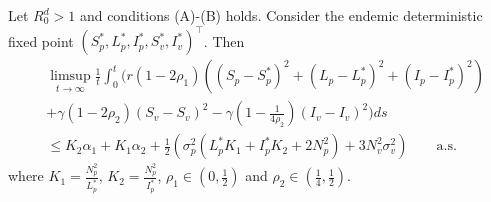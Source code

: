 \begin{theorem}
	\label{Upper_Bound}
	Let $R^d_0>1$ and conditions (A)-(B) holds. 
	Consider the endemic deterministic fixed point 
	$(S_p^*,L_p^*,I_p^*,S_v^*,I_v^*)^\top$. Then 
	\begin{equation}\label{UP-1}
		\begin{aligned}
			&\limsup\limits_{t \rightarrow 	\infty}
			\frac{1}{t}
			\int_{0}^{t}( r
				\left(
					1 - 2 \rho_1
				\right)
				\left(
					(S_p - S_p^*) ^ 2 + 
					(L_p - L_p^*) ^ 2 + 
					(I_p - I_p^*) ^ 2
				\right)
			\\
			&+
				\gamma
				\left(
					1 - 2 \rho_2
				\right)
				(S_v - S_v) ^ 2 - 
				\gamma
				\left(
					1 - 
					\frac{1}{4 \rho_2}
				\right)
				(I_v - I_v)^2)ds
			\\
			&\leq
				K_2
				\alpha_1 + K_1
				\alpha_2 + 
				\frac{1}{2}
				\left(
					\sigma_p ^ 2
					( L_p ^ *K_1 + I_p ^ *K_2 + 2N_p^2)
					+3 N_v^2 \sigma_v^2
				\right)
				\qquad\mbox{a.s.}
		\end{aligned}
	\end{equation}
%
	where 
	$
		K_1 = \frac{N_p^2}{L_p^*}
	$, 
	$
		K_2 = \frac{N_p^2}{I_p^*}
	$, 
	$
		\rho_1 \in (0, \frac{1}{2})
	$ and 
	$
		\rho_2\in (\frac{1}{4}, \frac{1}{2})
	$.
\end{theorem}
%
